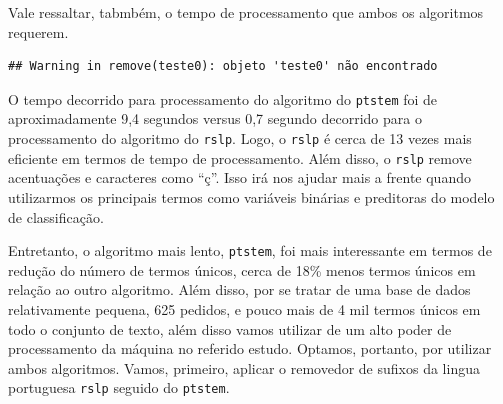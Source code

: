 \documentclass[]{article}
\newenvironment{Shaded}{\begin{snugshade}}{\end{snugshade}}
\newcommand{\KeywordTok}[1]{\textcolor[rgb]{0.13,0.29,0.53}{\textbf{#1}}}
\newcommand{\StringTok}[1]{\textcolor[rgb]{0.31,0.60,0.02}{#1}}
\newcommand{\OperatorTok}[1]{\textcolor[rgb]{0.81,0.36,0.00}{\textbf{#1}}}
\newcommand{\NormalTok}[1]{#1}
\begin{document}
Vale ressaltar, tabmbém, o tempo de processamento que ambos os
algoritmos requerem.

\begin{Shaded}
\end{Shaded}

\begin{verbatim}
## Warning in remove(teste0): objeto 'teste0' não encontrado
\end{verbatim}

\begin{Shaded}
\end{Shaded}

O tempo decorrido para processamento do algoritmo do \texttt{ptstem} foi
de aproximadamente 9,4 segundos versus 0,7 segundo decorrido para o
processamento do algoritmo do \texttt{rslp}. Logo, o \texttt{rslp} é
cerca de 13 vezes mais eficiente em termos de tempo de processamento.
Além disso, o \texttt{rslp} remove acentuações e caracteres como ``ç''.
Isso irá nos ajudar mais a frente quando utilizarmos os principais
termos como variáveis binárias e preditoras do modelo de classificação.

Entretanto, o algoritmo mais lento, \texttt{ptstem}, foi mais
interessante em termos de redução do número de termos únicos, cerca de
18\% menos termos únicos em relação ao outro algoritmo. Além disso, por
se tratar de uma base de dados relativamente pequena, 625 pedidos, e
pouco mais de 4 mil termos únicos em todo o conjunto de texto, além
disso vamos utilizar de um alto poder de processamento da máquina no
referido estudo. Optamos, portanto, por utilizar ambos algoritmos.
Vamos, primeiro, aplicar o removedor de sufixos da lingua portuguesa
\texttt{rslp} seguido do \texttt{ptstem}.
\end{document}
